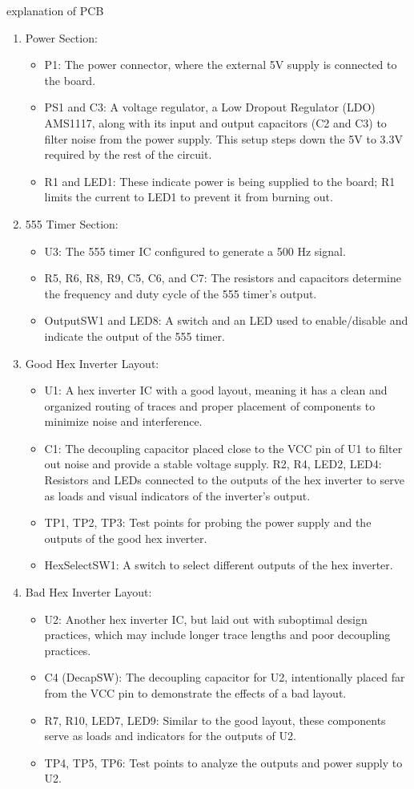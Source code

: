 \documentclass[a4paper,11pt]{article}%
\begin{document}
explanation of PCB
\begin{enumerate}
	\item Power Section:
	\begin{itemize}
		\item P1: The power connector, where the external 5V supply is connected to the board.
		\item PS1 and C3: A voltage regulator, a Low Dropout Regulator (LDO) AMS1117, along with its input and output capacitors (C2 and C3) to filter noise from the power supply. This setup steps down the 5V to 3.3V required by the rest of the circuit.
		\item R1 and LED1: These indicate power is being supplied to the board; R1 limits the current to LED1 to prevent it from burning out.
	\end{itemize}
	\item 555 Timer Section:
	\begin{itemize}
		\item U3: The 555 timer IC configured to generate a 500 Hz signal.
		\item R5, R6, R8, R9, C5, C6, and C7: The resistors and capacitors determine the frequency and duty cycle of the 555 timer's output.
		\item OutputSW1 and LED8: A switch and an LED used to enable/disable and indicate the output of the 555 timer.
	\end{itemize}
	\item Good Hex Inverter Layout:
	\begin{itemize}
		\item U1: A hex inverter IC with a good layout, meaning it has a clean and organized routing of traces and proper placement of components to minimize noise and interference.
		\item C1: The decoupling capacitor placed close to the VCC pin of U1 to filter out noise and provide a stable voltage supply.
		R2, R4, LED2, LED4: Resistors and LEDs connected to the outputs of the hex inverter to serve as loads and visual indicators of the inverter’s output.
		\item TP1, TP2, TP3: Test points for probing the power supply and the outputs of the good hex inverter.
		\item HexSelectSW1: A switch to select different outputs of the hex inverter.
	\end{itemize}
	\item Bad Hex Inverter Layout:
	\begin{itemize}
		\item 	U2: Another hex inverter IC, but laid out with suboptimal design practices, which may include longer trace lengths and poor decoupling practices.
		\item C4 (DecapSW): The decoupling capacitor for U2, intentionally placed far from the VCC pin to demonstrate the effects of a bad layout.
		\item R7, R10, LED7, LED9: Similar to the good layout, these components serve as loads and indicators for the outputs of U2.
		\item TP4, TP5, TP6: Test points to analyze the outputs and power supply to U2.
	\end{itemize}


\end{enumerate}
\end{document}
